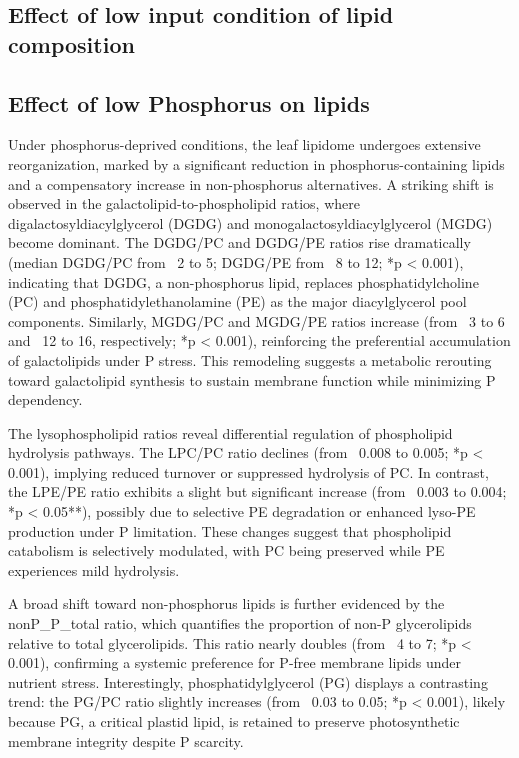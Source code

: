 \documentclass[10pt,letterpaper]{article}
\begin{document}
\subsection*{Effect of low input condition of lipid composition}
\subsection*{Effect of low Phosphorus on lipids}
Under phosphorus-deprived conditions, the leaf lipidome undergoes extensive reorganization, marked by a significant reduction in phosphorus-containing lipids and a compensatory increase in non-phosphorus alternatives. A striking shift is observed in the galactolipid-to-phospholipid ratios, where digalactosyldiacylglycerol (DGDG) and monogalactosyldiacylglycerol (MGDG) become dominant. The DGDG/PC and DGDG/PE ratios rise dramatically (median DGDG/PC from ~2 to 5; DGDG/PE from ~8 to 12; *p < 0.001), indicating that DGDG, a non-phosphorus lipid, replaces phosphatidylcholine (PC) and phosphatidylethanolamine (PE) as the major diacylglycerol pool components. Similarly, MGDG/PC and MGDG/PE ratios increase (from ~3 to 6 and ~12 to 16, respectively; *p < 0.001), reinforcing the preferential accumulation of galactolipids under P stress. This remodeling suggests a metabolic rerouting toward galactolipid synthesis to sustain membrane function while minimizing P dependency.

The lysophospholipid ratios reveal differential regulation of phospholipid hydrolysis pathways. The LPC/PC ratio declines (from ~0.008 to 0.005; *p < 0.001), implying reduced turnover or suppressed hydrolysis of PC. In contrast, the LPE/PE ratio exhibits a slight but significant increase (from ~0.003 to 0.004; *p < 0.05**), possibly due to selective PE degradation or enhanced lyso-PE production under P limitation. These changes suggest that phospholipid catabolism is selectively modulated, with PC being preserved while PE experiences mild hydrolysis.

A broad shift toward non-phosphorus lipids is further evidenced by the nonP_P_total ratio, which quantifies the proportion of non-P glycerolipids relative to total glycerolipids. This ratio nearly doubles (from ~4 to 7; *p < 0.001), confirming a systemic preference for P-free membrane lipids under nutrient stress. Interestingly, phosphatidylglycerol (PG) displays a contrasting trend: the PG/PC ratio slightly increases (from ~0.03 to 0.05; *p < 0.001), likely because PG, a critical plastid lipid, is retained to preserve photosynthetic membrane integrity despite P scarcity.
\end{document}
